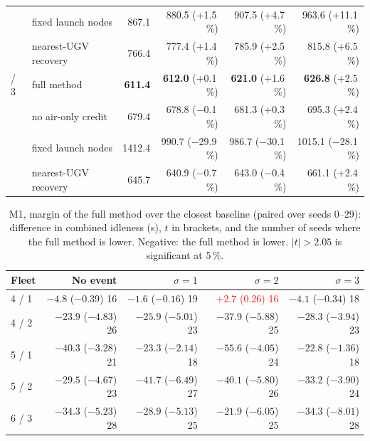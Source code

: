 \documentclass[11pt]{article}
\newcommand{\tie}[1]{\textcolor{red}{#1}}
\theoremstyle{definition}
\theoremstyle{plain}
\begin{document}
\begin{table}[H]
\begin{tabular}{llrrrr}
 & fixed launch nodes & 867.1 & 880.5 (+1.5\,\%) & 907.5 (+4.7\,\%) & 963.6 (+11.1\,\%) \\
 & nearest-UGV recovery & 766.4 & 777.4 (+1.4\,\%) & 785.9 (+2.5\,\%) & 815.8 (+6.5\,\%) \\
\addlinespace
6 / 3 & full method & \textbf{611.4} & \textbf{612.0} (+0.1\,\%) & \textbf{621.0} (+1.6\,\%) & \textbf{626.8} (+2.5\,\%) \\
 & no air-only credit & 679.4 & 678.8 ($-$0.1\,\%) & 681.3 (+0.3\,\%) & 695.3 (+2.4\,\%) \\
 & fixed launch nodes & 1412.4 & 990.7 ($-$29.9\,\%) & 986.7 ($-$30.1\,\%) & 1015.1 ($-$28.1\,\%) \\
 & nearest-UGV recovery & 645.7 & 640.9 ($-$0.7\,\%) & 643.0 ($-$0.4\,\%) & 661.1 (+2.4\,\%) \\
\bottomrule
\end{tabular}
\end{table}

\begin{table}[H]
\centering
\small
\caption{M1, margin of the full method over the closest baseline (paired over seeds 0--29): difference in combined idleness (s), $t$ in brackets, and the number of seeds where the full method is lower. Negative: the full method is lower. $|t| > 2.05$ is significant at 5\,\%.}
\label{tab:m1evmargin}
\begin{tabular}{lrrrr}
\toprule
Fleet & No event & $\sigma = 1$ & $\sigma = 2$ & $\sigma = 3$ \\
\midrule
4 / 1 & $-4.8$ ($-0.39$) 16 & $-1.6$ ($-0.16$) 19 & \tie{$+2.7$ ($0.26$) 16} & $-4.1$ ($-0.34$) 18 \\
4 / 2 & $-23.9$ ($-4.83$) 26 & $-25.9$ ($-5.01$) 23 & $-37.9$ ($-5.88$) 25 & $-28.3$ ($-3.94$) 23 \\
5 / 1 & $-40.3$ ($-3.28$) 21 & $-23.3$ ($-2.14$) 18 & $-55.6$ ($-4.05$) 24 & $-22.8$ ($-1.36$) 18 \\
5 / 2 & $-29.5$ ($-4.67$) 23 & $-41.7$ ($-6.49$) 27 & $-40.1$ ($-5.80$) 26 & $-33.2$ ($-3.90$) 24 \\
6 / 3 & $-34.3$ ($-5.23$) 28 & $-28.9$ ($-5.13$) 25 & $-21.9$ ($-6.05$) 25 & $-34.3$ ($-8.01$) 28 \\
\bottomrule
\end{tabular}
\end{table}
\end{document}
